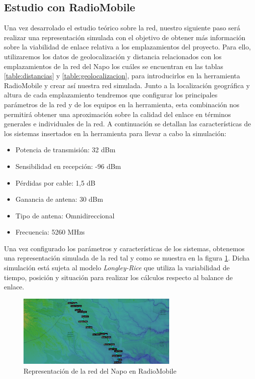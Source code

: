 \subsection{Estudio con RadioMobile}
	Una vez desarrolado el estudio teórico sobre la red, nuestro siguiente paso será realizar una representación simulada con el objetivo de obtener más información sobre la viabilidad de enlace relativa a los emplazamientos del proyecto. Para ello, utilizaremos los datos de geolocalización y distancia relacionados con los emplazamientos de la red del Napo los cuáles se encuentran en las tablas \ref{table:distancias} y \ref{table:geolocalizacion}, para introducirlos en la herramienta RadioMobile y crear así nuestra red simulada. Junto a la localización geográfica y altura de cada emplazamiento tendremos que configurar los principales parámetros de la red y de los equipos en la herramienta, esta combinación nos permitirá obtener una aproximación sobre la calidad del enlace en términos generales e individuales de la red. A continuación se detallan las características de los sistemas insertados en la herramienta para llevar a cabo la simulación:
	\begin{itemize}
		\item Potencia de transmisión: 32 dBm
		\item Sensibilidad en recepción: -96 dBm
		\item Pérdidas por cable: 1,5 dB
		\item Ganancia de antena: 30 dBm
		\item Tipo de antena: Omnidireccional
		\item Frecuencia: 5260 MHzs
	\end{itemize}
	Una vez configurado los parámetros y características de los sistemas, obtenemos una representación simulada de la red tal y como se muestra en la figura \ref{redNapo}. Dicha simulación está sujeta al modelo \textit{Longley-Rice} que utiliza la variabilidad de tiempo, posición y situación para realizar los cálculos respecto al balance de enlace.  
	\begin{figure}[H]
		\centering
		\includegraphics[width=0.7\textwidth]{img/redNapo.PNG}
		\caption{Representación de la red del Napo en RadioMobile}
		\label{redNapo}
	\end{figure}
